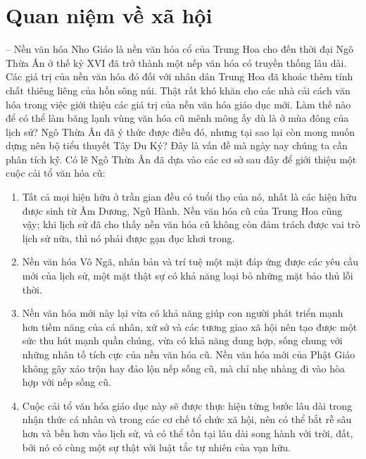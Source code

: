 \section{Quan niệm về xã hội} %
\label{sec:47_48_xa_hoi}

-- Nền văn hóa Nho Giáo là nền văn hóa cổ của Trung Hoa cho đến thời đại Ngô Thừa Ân ở thế kỷ XVI đã trở thành một nếp văn hóa có truyền thống lâu dài. Các giá trị của nền văn hóa đó đối với nhân dân Trung Hoa đã khoác thêm tính chất thiêng liêng của hồn sông núi. Thật rất khó khăn cho các nhà cải cách văn hóa trong việc giới thiệu các giá trị của nền văn hóa giáo dục mới. Làm thế nào để có thể làm băng lạnh vùng văn hóa cũ mênh mông ấy dù là ở mùa đông của lịch sử? Ngô Thừa Ân đã ý thức được điều đó, nhưng tại sao lại còn mong muốn dựng nên bộ tiểu thuyết Tây Du Ký? Đây là vấn đề mà ngày nay chúng ta cần phân tích kỹ. Có lẽ Ngô Thừa Ân đã dựa vào các cơ sở sau đây để giới thiệu một cuộc cải tổ văn hóa cũ:

\begin{enumerate}[label=\itshape\arabic*\upshape/]
    \item Tất cả mọi hiện hữu ở trần gian đều có tuổi thọ của nó, nhất là các hiện hữu được sinh từ Âm Dương, Ngũ Hành. Nền văn hóa cũ của Trung Hoa cũng vậy; khi lịch sử đã cho thấy nền văn hóa cũ không còn đảm trách được vai trò lịch sử nữa, thì nó phải được gạn đục khơi trong.

    \item Nền văn hóa Vô Ngã, nhân bản và trí tuệ một mặt đáp ứng được các yêu cầu mới của lịch sử, một mặt thật sự có khả năng loại bỏ những mặt bảo thủ lỗi thời.

    \item Nền văn hóa mới này lại vừa có khả năng giúp con người phát triển mạnh hơn tiềm năng của cá nhân, xứ sở và các tương giao xã hội nên tạo được một sức thu hút mạnh quần chúng, vừa có khả năng dung hợp, sống chung với những nhân tố tích cực của nền văn hóa cũ. Nền văn hóa mới của Phật Giáo không gây xáo trộn hay đảo lộn nếp sống cũ, mà chỉ nhẹ nhàng đi vào hòa hợp với nếp sống cũ.

    \item Cuộc cải tổ văn hóa giáo dục này sẽ được thực hiện từng bước lâu dài trong nhận thức cá nhân và trong các cơ chế tổ chức xã hội, nên có thể bắt rễ sâu hơn và bền hơn vào lịch sử, và có thể tồn tại lâu dài song hành với trời, đất, bởi nó có cùng một sự thật với luật tắc tự nhiên của vạn hữu.
\end{enumerate}

